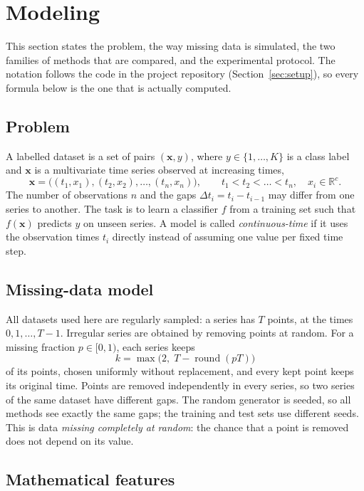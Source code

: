 \section{Modeling}\label{sec:model}

This section states the problem, the way missing data is simulated, the
two families of methods that are compared, and the experimental protocol.
The notation follows the code in the project repository
(Section~\ref{sec:setup}), so every formula below is the one that is
actually computed.

\subsection{Problem}

A labelled dataset is a set of pairs $(\mathbf{x}, y)$, where $y \in
\{1, \dots, K\}$ is a class label and $\mathbf{x}$ is a multivariate time
series observed at increasing times,
\[
  \mathbf{x} = \bigl((t_1, x_1), (t_2, x_2), \dots, (t_n, x_n)\bigr),
  \qquad t_1 < t_2 < \dots < t_n, \quad x_i \in \mathbb{R}^c .
\]
The number of observations $n$ and the gaps $\Delta t_i = t_i - t_{i-1}$
may differ from one series to another. The task is to learn a classifier
$f$ from a training set such that $f(\mathbf{x})$ predicts $y$ on unseen
series. A model is called \emph{continuous-time} if it uses the
observation times $t_i$ directly instead of assuming one value per fixed
time step.

\subsection{Missing-data model}\label{sec:missing}

All datasets used here are regularly sampled: a series has $T$ points,
at the times $0, 1, \dots, T-1$. Irregular series are obtained by removing
points at random. For a missing fraction $p \in [0, 1)$, each series keeps
\[
  k = \max\bigl(2,\; T - \operatorname{round}(pT)\bigr)
\]
of its points, chosen uniformly without replacement, and every kept point
keeps its original time. Points are removed independently in every
series, so two series of the same dataset have different gaps. The random
generator is seeded, so all methods see exactly the same gaps; the
training and test sets use different seeds. This is data
\emph{missing completely at random}: the chance that a point is removed
does not depend on its value.

\subsection{Mathematical features}\label{sec:features}

